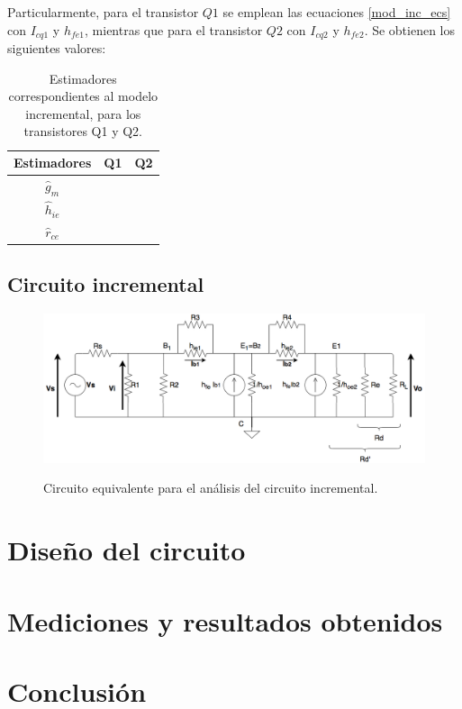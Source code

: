 	Particularmente, para el transistor $Q1$ se emplean las ecuaciones \ref{mod_inc_ecs} con $I_{cq1}$ y $h_{fe1}$, mientras que para el transistor $Q2$ con $I_{cq2}$ y $h_{fe2}$. Se obtienen los siguientes valores:
	
	\begin{table}[h!]
		\centering
		\begin{tabular}{c c c}%
			\bfseries Estimadores & Q1 & Q2 \\ \hline
			$\widehat{g}_m$ &  & \\
			$\widehat{h}_{ie}$ &  & \\
			$\widehat{r}_{ce}$&  & \\
			\hline
		\end{tabular}
		\caption{Estimadores correspondientes al modelo incremental, para los transistores Q1 y Q2.}
		\label{avolf}
	\end{table}
	
	\subsection{Circuito incremental}
	
		\begin{figure}[H]
			\centering
			\includegraphics[scale=0.4]{../circ_incremental.png} \\
			\caption{Circuito equivalente para el an\'alisis del circuito incremental.}
			\label{circ_incremental}
		\end{figure}

\section{Diseño del circuito}

\section{Mediciones y resultados obtenidos}

\section{Conclusi\'on}



